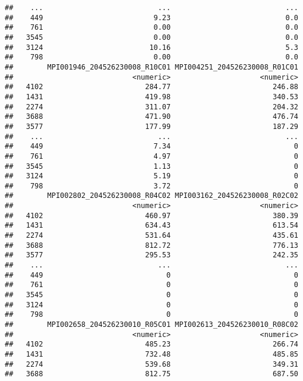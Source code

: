 \documentclass[
]{article}
\begin{document}
\begin{verbatim}
##    ...                           ...                           ...
##    449                          9.23                           0.0
##    761                          0.00                           0.0
##   3545                          0.00                           0.0
##   3124                         10.16                           5.3
##    798                          0.00                           0.0
##        MPI001946_204526230008_R10C01 MPI004251_204526230008_R01C01
##                            <numeric>                     <numeric>
##   4102                        284.77                        246.88
##   1431                        419.98                        340.53
##   2274                        311.07                        204.32
##   3688                        471.90                        476.74
##   3577                        177.99                        187.29
##    ...                           ...                           ...
##    449                          7.34                             0
##    761                          4.97                             0
##   3545                          1.13                             0
##   3124                          5.19                             0
##    798                          3.72                             0
##        MPI002802_204526230008_R04C02 MPI003162_204526230008_R02C02
##                            <numeric>                     <numeric>
##   4102                        460.97                        380.39
##   1431                        634.43                        613.54
##   2274                        531.64                        435.61
##   3688                        812.72                        776.13
##   3577                        295.53                        242.35
##    ...                           ...                           ...
##    449                             0                             0
##    761                             0                             0
##   3545                             0                             0
##   3124                             0                             0
##    798                             0                             0
##        MPI002658_204526230010_R05C01 MPI002613_204526230010_R08C02
##                            <numeric>                     <numeric>
##   4102                        485.23                        266.74
##   1431                        732.48                        485.85
##   2274                        539.68                        349.31
##   3688                        812.75                        687.50

\end{verbatim}
\end{document}
